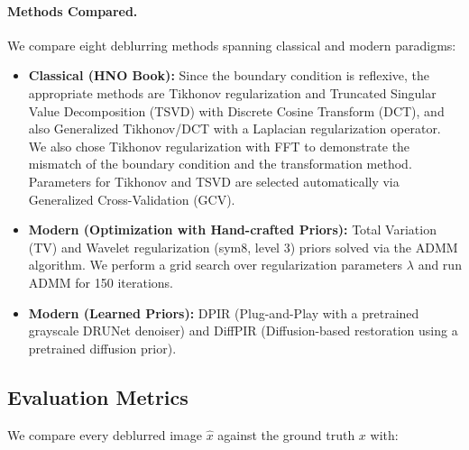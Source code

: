 \documentclass[12pt, a4paper, onecolumn]{article}
\theoremstyle{plain}          %
\theoremstyle{definition}     %
\theoremstyle{remark}
\begin{document}
\paragraph{Methods Compared.}
We compare eight deblurring methods spanning classical and modern paradigms:
\begin{itemize}
    \item \textbf{Classical (HNO Book):} Since the boundary condition is reflexive, the appropriate methods are Tikhonov regularization and Truncated Singular Value Decomposition (TSVD) with Discrete Cosine Transform (DCT), and also Generalized Tikhonov/DCT with a Laplacian regularization operator. We also chose Tikhonov regularization with FFT to demonstrate the mismatch of the boundary condition and the transformation method. Parameters for Tikhonov and TSVD are selected automatically via Generalized Cross-Validation (GCV).
    \item \textbf{Modern (Optimization with Hand-crafted Priors):} Total Variation (TV) and Wavelet regularization (sym8, level 3) priors solved via the ADMM algorithm. We perform a grid search over regularization parameters $\lambda$ and run ADMM for 150 iterations.
    \item \textbf{Modern (Learned Priors):} DPIR (Plug-and-Play with a pretrained grayscale DRUNet denoiser) and DiffPIR (Diffusion-based restoration using a pretrained diffusion prior).
\end{itemize}

\subsection{Evaluation Metrics}
\label{sec:metrics}

We compare every deblurred image $\hat x$ against the ground truth $x$ with:
\end{document}
